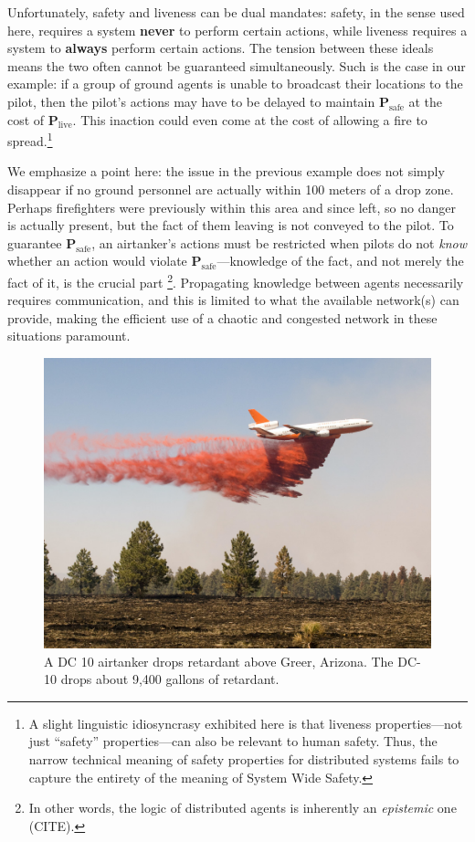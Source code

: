 \documentclass[]             %
{NASA}                       %
\theoremstyle{definition}
\begin{document}
Unfortunately, safety and liveness can be dual mandates: safety, in the
sense used here, requires a system \textbf{never} to perform certain
actions, while liveness requires a system to \textbf{always} perform
certain actions. The tension between these ideals means the two often
cannot be guaranteed simultaneously. Such is the case in our example: if
a group of ground agents is unable to broadcast their locations to the
pilot, then the pilot's actions may have to be delayed to maintain
\(\textbf{P}_\textrm{safe}\) at the cost of
\(\textbf{P}_\textrm{live}\). This inaction could even come at the cost
of allowing a fire to spread.\footnote{A slight linguistic idiosyncrasy
  exhibited here is that liveness properties---not just ``safety''
  properties---can also be relevant to human safety. Thus, the narrow
  technical meaning of safety properties for distributed systems fails
  to capture the entirety of the meaning of System Wide Safety.}

We emphasize a point here: the issue in the previous example does not
simply disappear if no ground personnel are actually within 100 meters
of a drop zone. Perhaps firefighters were previously within this area
and since left, so no danger is actually present, but the fact of them
leaving is not conveyed to the pilot. To guarantee
\(\textbf{P}_\textrm{safe}\), an airtanker's actions must be restricted
when pilots do not \emph{know} whether an action would violate
\(\textbf{P}_\textrm{safe}\)---knowledge of the fact, and not merely the
fact of it, is the crucial part \footnote{In other words, the logic of
  distributed agents is inherently an \emph{epistemic} one (CITE).}.
Propagating knowledge between agents necessarily requires communication,
and this is limited to what the available network(s) can provide, making
the efficient use of a chaotic and congested network in these situations
paramount.

\begin{figure}[h]
\centering
\includegraphics[scale=0.4]{images/dc10.jpg}
\caption{A DC 10 airtanker drops retardant above Greer, Arizona. The DC-10 drops about 9,400 gallons of retardant.}
\end{figure}
\end{document}

